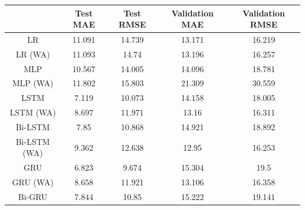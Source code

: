\begin{table}[!]
    \renewcommand{\arraystretch}{1.5}
    \begin{center}
        \vspace{-0.5cm}
        \footnotesize
        \begin{tabular}{ |c|c|c|c|c| }
            \hline
            & Test MAE                  & Test RMSE                  & Validation MAE             & Validation RMSE            \\
            \hline
            LR           & \cellcolor{red!10}11.091  & \cellcolor{red!10}14.739   & 13.171                     & \cellcolor{green!30}16.219 \\
            \hline
            LR (WA)      & \cellcolor{red!20}11.093  & \cellcolor{red!20}14.74    & 13.196                     & 16.257                     \\
            \hline
            MLP          & 10.567                    & 14.005                     & 14.096                     & 18.781                     \\
            \hline
            MLP (WA)     & \cellcolor{red!30}11.802  & \cellcolor{red!30}15.803   & \cellcolor{red!30}21.309   & \cellcolor{red!30}30.559   \\
            \hline
            LSTM         & \cellcolor{green!10}7.119 & \cellcolor{green!10}10.073 & 14.158                     & 18.005                     \\
            \hline
            LSTM (WA)    & 8.697                     & 11.971                     & 13.16                      & 16.311                     \\
            \hline
            Bi-LSTM      & 7.85                      & 10.868                     & 14.921                     & \cellcolor{red!10}18.892   \\
            \hline
            Bi-LSTM (WA) & 9.362                     & 12.638                     & \cellcolor{green!30}12.95  & \cellcolor{green!10}16.253 \\
            \hline
            GRU          & \cellcolor{green!20}6.823 & \cellcolor{green!20}9.674  & \cellcolor{red!20}15.304   & 19.5                       \\
            \hline
            GRU (WA)     & 8.658                     & 11.921                     & \cellcolor{green!10}13.106 & 16.358                     \\
            \hline
            Bi-GRU       & 7.844                     & 10.85                      & \cellcolor{red!10}15.222   & \cellcolor{red!20}19.141   \\

\end{tabular}
\end{center}
\end{table}
